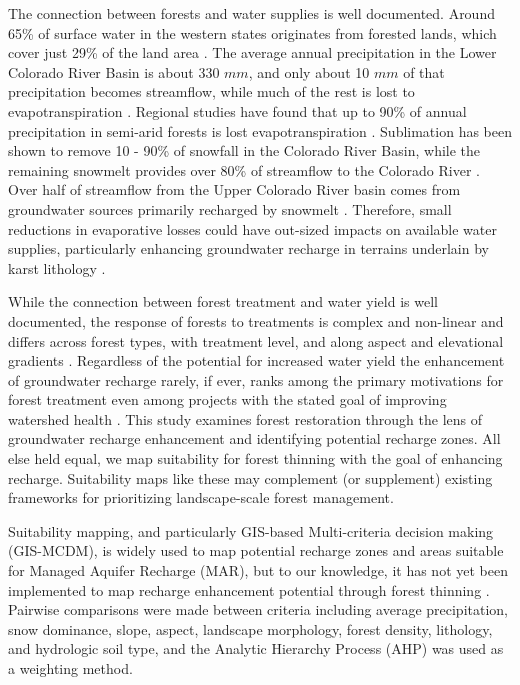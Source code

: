 \documentclass[
  number]{elsarticle}
\begin{document}
The connection between forests and water supplies is well documented.
Around 65\% of surface water in the western states originates from
forested lands, which cover just 29\% of the land area
\citep{brown_source_2005}. The average annual precipitation in the Lower
Colorado River Basin is about 330 \(mm\), and only about 10 \(mm\) of
that precipitation becomes streamflow, while much of the rest is lost to
evapotranspiration \citep{zou_streamflow_2010}. Regional studies have
found that up to 90\% of annual precipitation in semi-arid forests is
lost evapotranspiration
\citep{dore_recovery_2012, ha_evapotranspiration_2015, yaseef_ecohydrology_2010, hibbert1979}.
Sublimation has been shown to remove 10 - 90\% of snowfall in the
Colorado River Basin, while the remaining snowmelt provides over 80\% of
streamflow to the Colorado River \citep{lundquist_sublimation_2024}.
Over half of streamflow from the Upper Colorado River basin comes from
groundwater sources primarily recharged by snowmelt \citep{miller2016}.
Therefore, small reductions in evaporative losses could have out-sized
impacts on available water supplies, particularly enhancing groundwater
recharge in terrains underlain by karst lithology
\citep{hibbert1979, wyatt2013}.

While the connection between forest treatment and water yield is well
documented, the response of forests to treatments is complex and
non-linear and differs across forest types, with treatment level, and
along aspect and elevational gradients
\citep{del_campo_global_2022, biederman_streamflow_2022, zou_streamflow_2010, hibbert1979, moore_physical_2005}.
Regardless of the potential for increased water yield the enhancement of
groundwater recharge rarely, if ever, ranks among the primary
motivations for forest treatment even among projects with the stated
goal of improving watershed health
\citep{stanturf2014, filoso2017, allen_ecological_2002, friederici2013, odonnell2016}.
This study examines forest restoration through the lens of groundwater
recharge enhancement and identifying potential recharge zones. All else
held equal, we map suitability for forest thinning with the goal of
enhancing recharge. Suitability maps like these may complement (or
supplement) existing frameworks for prioritizing landscape-scale forest
management.

Suitability mapping, and particularly GIS-based Multi-criteria decision
making (GIS-MCDM), is widely used to map potential recharge zones and
areas suitable for Managed Aquifer Recharge (MAR), but to our knowledge,
it has not yet been implemented to map recharge enhancement potential
through forest thinning \citep{fathi2021, rajashekar2023}. Pairwise
comparisons were made between criteria including average precipitation,
snow dominance, slope, aspect, landscape morphology, forest density,
lithology, and hydrologic soil type, and the Analytic Hierarchy Process
(AHP) was used as a weighting method.
\end{document}
